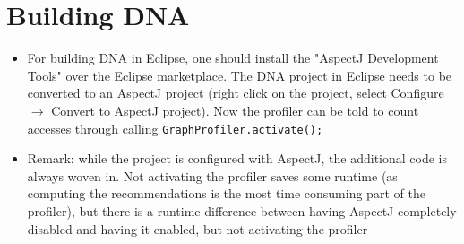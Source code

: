 \section{Building DNA}
	\begin{itemize}
		\item For building DNA in Eclipse, one should install the "AspectJ Development Tools"
			over the Eclipse marketplace. The DNA project in Eclipse needs to be converted to an
			AspectJ project (right click on the project, select Configure $\rightarrow$ Convert to
			AspectJ project). Now the profiler can be told to count accesses through calling
			\texttt{Graph\allowbreak Profiler.\allowbreak activate();}
		\item Remark: while the project is configured with AspectJ, the additional code is
			always woven in. Not activating the profiler saves some runtime (as computing the
			recommendations is the most time consuming part of the profiler), but there is a
			runtime difference between having AspectJ completely disabled and having it enabled,
			but not activating the profiler
	\end{itemize}
	
